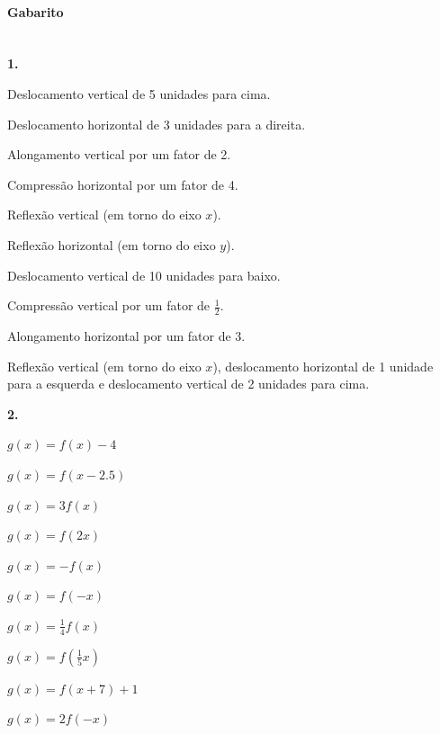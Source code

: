 \documentclass[a4paper,12pt]{article}
\begin{document}
\vspace*{\fill}
{\footnotesize\color{gray}
\paragraph*{Gabarito} \hspace*{\fill}\\
\textbf{1.}
  \begin{inparaenum}[a)]
        \item Deslocamento vertical de 5 unidades para cima.
        \item Deslocamento horizontal de 3 unidades para a direita.
        \item Alongamento vertical por um fator de 2.
        \item Compressão horizontal por um fator de 4.
        \item Reflexão vertical (em torno do eixo $x$).
        \item Reflexão horizontal (em torno do eixo $y$).
        \item Deslocamento vertical de 10 unidades para baixo.
        \item Compressão vertical por um fator de $\frac{1}{2}$.
        \item Alongamento horizontal por um fator de 3.
        \item Reflexão vertical (em torno do eixo $x$), deslocamento horizontal de 1 unidade para a esquerda e deslocamento vertical de 2 unidades para cima.
    \end{inparaenum}
\textbf{2.}
\begin{inparaenum}[a)]
        \item $g(x) = f(x) - 4$
        \item $g(x) = f(x - 2.5)$
        \item $g(x) = 3f(x)$
        \item $g(x) = f(2x)$
        \item $g(x) = -f(x)$
        \item $g(x) = f(-x)$
        \item $g(x) = \frac{1}{4}f(x)$
        \item $g(x) = f\left(\frac{1}{5}x\right)$
        \item $g(x) = f(x + 7) + 1$
        \item $g(x) = 2f(-x)$
    \end{inparaenum}
}
\end{document}
